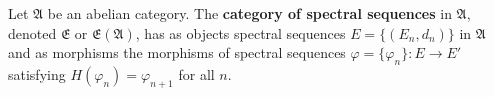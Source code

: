 Let $\mathfrak{A}$ be an abelian category. The \textbf{category of spectral sequences} in $\mathfrak{A}$, denoted $\mathfrak{E}$ or $\mathfrak{E}(\mathfrak{A})$, has as objects spectral sequences $E = \{(E_n, d_n)\}$ in $\mathfrak{A}$ and as morphisms the morphisms of spectral sequences $\varphi = \{\varphi_n\}: E \to E'$ satisfying $H(\varphi_n) = \varphi_{n+1}$ for all $n$.
